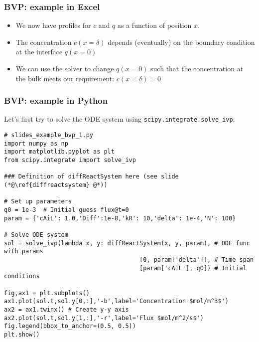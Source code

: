 \begin{frame}
  \frametitle{BVP: example in Excel}  
  \begin{itemize}
    \item We now have profiles for $c$ and $q$ as a function of position $x$.
    \item The concentration $c(x=\delta)$ depends (eventually) on the boundary condition at the interface $q(x=0)$
    \item We can use the solver to change $q(x=0)$ such that the concentration at the bulk meets our requirement: $c(x=\delta)=0$
  \end{itemize}

\end{frame}


\begin{frame}[fragile,label={diffReactODEtrial}]
  \frametitle{BVP: example in Python}
  Let's first try to solve the ODE system using \lstinline$scipy.integrate.solve_ivp$: 
  \begin{lstlisting}
# slides_example_bvp_1.py
import numpy as np
import matplotlib.pyplot as plt
from scipy.integrate import solve_ivp

### Definition of diffReactSystem here (see slide (*@\ref{diffreactsystem} @*))

# Set up parameters
q0 = 1e-3  # Initial guess flux@t=0
param = {'cAiL': 1.0,'Diff':1e-8,'kR': 10,'delta': 1e-4,'N': 100}

# Solve ODE system
sol = solve_ivp(lambda x, y: diffReactSystem(x, y, param), # ODE func with params
                                      [0, param['delta']], # Time span
                                      [param['cAiL'], q0]) # Initial conditions

fig,ax1 = plt.subplots()
ax1.plot(sol.t,sol.y[0,:],'-b',label='Concentration $mol/m^3$')
ax2 = ax1.twinx() # Create y-y axis
ax2.plot(sol.t,sol.y[1,:],'-r',label='Flux $mol/m^2/s$')
fig.legend(bbox_to_anchor=(0.5, 0.5))
plt.show()   
  \end{lstlisting}
\end{frame}

